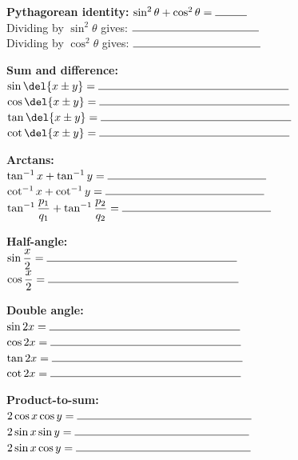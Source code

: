 \documentclass[10pt,paper=letter]{scrartcl}
\begin{document}
\begin{multicols}{2}

  \noindent\textbf{Pythagorean identity:} $\sin^2 \theta + \cos^2 \theta = \rule{1cm}{0.15mm}$\\Dividing by $\sin^2 \theta$ gives: $\rule{4cm}{0.15mm}$\\Dividing by $\cos^2 \theta$ gives: $\rule{4cm}{0.15mm}$

  \noindent\textbf{Sum and difference:}\\
  $\sin\del{x \pm y} = \rule{6cm}{0.15mm}$\\
  $\cos\del{x \pm y} = \rule{6cm}{0.15mm}$\vspace{0.75em}\\
  $\tan\del{x \pm y} = \rule{6cm}{0.15mm}$\vspace{0.75em}\\
  $\cot\del{x \pm y} = \rule{6cm}{0.15mm}$

  \noindent\textbf{Arctans:}\vspace{0.75em}\\
  $\tan^{-1}x + \tan^{-1}y = \rule{5cm}{0.15mm}$\vspace{0.75em}\\
  $\cot^{-1}x + \cot^{-1}y = \rule{5cm}{0.15mm}$\vspace{0.75em}\\
  $\tan^{-1}\dfrac{p_1}{q_1} + \tan^{-1}\dfrac{p_2}{q_2} = \rule{4.7cm}{0.15mm}$

  \noindent\textbf{Half-angle:}\vspace{0.75em}\\
  $\sin{\dfrac{x}2} = \rule{6cm}{0.15mm}$\vspace{0.75em}\\
  $\cos{\dfrac{x}2} = \rule{6cm}{0.15mm}$

  \columnbreak

  \noindent\textbf{Double angle:}\\
  $\sin{2x} = \rule{6cm}{0.15mm}$\\
  $\cos{2x} = \rule{6cm}{0.15mm}$\vspace{0.75em}\\
  $\tan{2x} = \rule{6cm}{0.15mm}$\vspace{0.75em}\\
  $\cot{2x} = \rule{6cm}{0.15mm}$

  \noindent\textbf{Product-to-sum:}\\
  $2\cos x \cos y = \rule{5.5cm}{0.15mm}$\\
  $2\sin x \sin y = \rule{5.5cm}{0.15mm}$\\
  $2\sin x \cos y = \rule{5.5cm}{0.15mm}$


\end{multicols}
\end{document}
